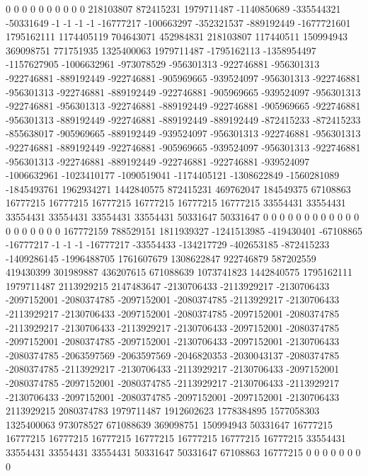 0 0 0 0 0 0 0 0 0 0 218103807 872415231 1979711487 -1140850689 -335544321 -50331649 -1 -1 -1 -1 -16777217 -100663297 -352321537 -889192449 -1677721601 1795162111 1174405119 704643071 452984831 218103807 117440511 150994943 369098751 771751935 1325400063 1979711487 -1795162113 -1358954497 -1157627905 -1006632961 -973078529 -956301313 -922746881 -956301313 -922746881 -889192449 -922746881 -905969665 -939524097 -956301313 -922746881 -956301313 -922746881 -889192449 -922746881 -905969665 -939524097 -956301313 -922746881 -956301313 -922746881 -889192449 -922746881 -905969665 -922746881 -956301313 -889192449 -922746881 -889192449 -889192449 -872415233 -872415233 -855638017 -905969665 -889192449 -939524097 -956301313 -922746881 -956301313 -922746881 -889192449 -922746881 -905969665 -939524097 -956301313 -922746881 -956301313 -922746881 -889192449 -922746881 -922746881 -939524097 -1006632961 -1023410177 -1090519041 -1174405121 -1308622849 -1560281089 -1845493761 1962934271 1442840575 872415231 469762047 184549375 67108863 16777215 16777215 16777215 16777215 16777215 16777215 33554431 33554431 33554431 33554431 33554431 33554431 50331647 50331647 0 0 0 0 0 0 0 0 0
0 0 0 0 0 0 0 0 0 0 167772159 788529151 1811939327 -1241513985 -419430401 -67108865 -16777217 -1 -1 -1 -16777217 -33554433 -134217729 -402653185 -872415233 -1409286145 -1996488705 1761607679 1308622847 922746879 587202559 419430399 301989887 436207615 671088639 1073741823 1442840575 1795162111 1979711487 2113929215 2147483647 -2130706433 -2113929217 -2130706433 -2097152001 -2080374785 -2097152001 -2080374785 -2113929217 -2130706433 -2113929217 -2130706433 -2097152001 -2080374785 -2097152001 -2080374785 -2113929217 -2130706433 -2113929217 -2130706433 -2097152001 -2080374785 -2097152001 -2080374785 -2097152001 -2130706433 -2097152001 -2130706433 -2080374785 -2063597569 -2063597569 -2046820353 -2030043137 -2080374785 -2080374785 -2113929217 -2130706433 -2113929217 -2130706433 -2097152001 -2080374785 -2097152001 -2080374785 -2113929217 -2130706433 -2113929217 -2130706433 -2097152001 -2080374785 -2097152001 -2097152001 -2130706433 2113929215 2080374783 1979711487 1912602623 1778384895 1577058303 1325400063 973078527 671088639 369098751 150994943 50331647 16777215 16777215 16777215 16777215 16777215 16777215 16777215 16777215 33554431 33554431 33554431 33554431 50331647 50331647 67108863 16777215 0 0 0 0 0 0 0 0
